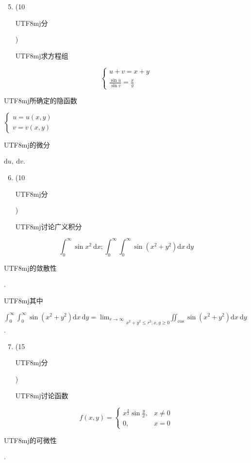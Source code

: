 \documentclass[10pt]{article}
\begin{document}
\begin{enumerate}
  \setcounter{enumi}{4}
  \item (10 \begin{CJK}{UTF8}{mj}分\end{CJK}) \begin{CJK}{UTF8}{mj}求方程组\end{CJK}
\end{enumerate}
$$
\left\{\begin{array}{l}
u+v=x+y \\
\frac{\sin u}{\sin v}=\frac{x}{y}
\end{array}\right.
$$
\begin{CJK}{UTF8}{mj}所确定的隐函数\end{CJK} $\left\{\begin{array}{l}u=u(x, y) \\ v=v(x, y)\end{array}\right.$ \begin{CJK}{UTF8}{mj}的微分\end{CJK} $\mathrm{d} u, \mathrm{~d} v$.

\begin{enumerate}
  \setcounter{enumi}{5}
  \item (10 \begin{CJK}{UTF8}{mj}分\end{CJK}) \begin{CJK}{UTF8}{mj}讨论广义积分\end{CJK}
\end{enumerate}
$$
\int_{0}^{\infty} \sin x^{2} \mathrm{~d} x ; \int_{0}^{\infty} \int_{0}^{\infty} \sin \left(x^{2}+y^{2}\right) \mathrm{d} x \mathrm{~d} y
$$
\begin{CJK}{UTF8}{mj}的敛散性\end{CJK}. \begin{CJK}{UTF8}{mj}其中\end{CJK} $\int_{0}^{\infty} \int_{0}^{\infty} \sin \left(x^{2}+y^{2}\right) \mathrm{d} x \mathrm{~d} y=\lim _{r \rightarrow \infty} \underset{x^{2}+y^{2} \leq r^{2} ; x, y \geq 0}{ } \iint_{\cos } \sin \left(x^{2}+y^{2}\right) \mathrm{d} x \mathrm{~d} y$.

\begin{enumerate}
  \setcounter{enumi}{6}
  \item (15 \begin{CJK}{UTF8}{mj}分\end{CJK}) \begin{CJK}{UTF8}{mj}讨论函数\end{CJK}
\end{enumerate}
$$
f(x, y)= \begin{cases}x^{\frac{3}{2}} \sin \frac{y}{x}, & x \neq 0 \\ 0, & x=0\end{cases}
$$
\begin{CJK}{UTF8}{mj}的可微性\end{CJK}.
\end{document}
